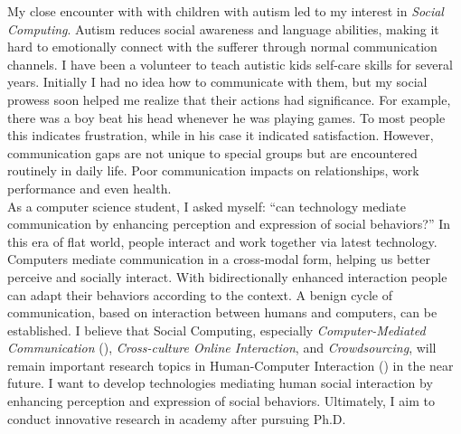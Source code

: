 My close encounter with with children with autism led to my interest in \textit{Social Computing}. 
Autism reduces social awareness and language abilities, 
making it hard to emotionally connect with the sufferer through normal communication channels.
I have been a volunteer to teach autistic kids self-care skills for several years.
Initially I had no idea how to communicate with them, 
but my social prowess soon helped me realize that their actions had significance. 
For example, there was a boy beat his head whenever he was playing games. 
To most people this indicates frustration, while in his case it indicated satisfaction.
However, communication gaps are not unique to special groups but are encountered routinely in daily life. 
Poor communication impacts on relationships, work performance and even health. \\

\noindent
As a computer science student, I asked myself: 
``can technology mediate communication by enhancing perception and expression of social behaviors?'' 
In this era of flat world, people interact and work together via latest technology.
Computers mediate communication in a cross-modal form, helping us better perceive and socially interact. 
With bidirectionally enhanced interaction people can adapt their behaviors according to the context. 
A benign cycle of communication, based on interaction between humans and computers, can be established. 
I believe that Social Computing, 
especially \textit{Computer-Mediated Communication} (), \textit{Cross-culture Online Interaction}, and \textit{Crowdsourcing},
will remain important research topics in Human-Computer Interaction () in the near future.
I want to develop technologies mediating human social interaction by enhancing perception and expression of social behaviors.
Ultimately, I aim to conduct innovative research in academy after pursuing Ph.D.\\

